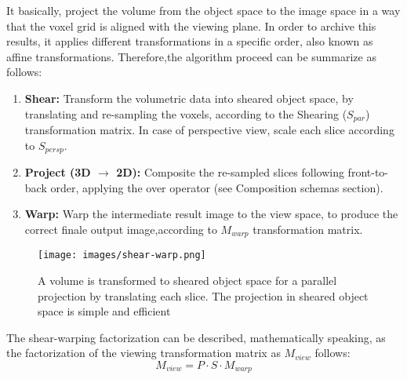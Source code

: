\documentclass[12pt,a4paper]{extarticle}
\begin{document}
It basically, project the volume from the object space to the image space in a way that the voxel grid is aligned with the viewing plane.
In order to archive this results, it applies different transformations in a specific order, also known as affine transformations.
Therefore,the algorithm proceed can be summarize as follows:
\begin{enumerate}
\item \textbf{Shear:} Transform the volumetric data into sheared object space, by translating and re-sampling the voxels, according to the Shearing ($S_{par}$) transformation matrix. In case of perspective view, scale each slice according to $S_{persp}$.
\item \textbf{Project (3D $\rightarrow$ 2D):} Composite the re-sampled slices following front-to-back order, applying the over operator (see Composition schemas section).
\item \textbf{Warp:} Warp the intermediate result image to the view space, to produce the correct finale output image,according to $M_{warp}$ transformation matrix.
\end{enumerate} %

\begin{figure}[hbtp]
\centering
\texttt{[image: images/shear-warp.png]}
\caption{ A volume is transformed to sheared object space for
a parallel projection by translating each slice. The projection in
sheared object space is simple and efficient}
\end{figure}

The shear-warping factorization can be described, mathematically speaking, as the factorization of the viewing transformation matrix as $M_{view}$ follows:
\[
M_{view} = P \cdot S \cdot M_{warp}
\]
\end{document}
